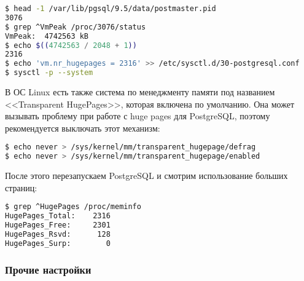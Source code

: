 \begin{lstlisting}[language=Bash,label=lst:settings_hugepages2,caption=Включаем поддержку huge pages в системе]
$ head -1 /var/lib/pgsql/9.5/data/postmaster.pid
3076
$ grep ^VmPeak /proc/3076/status
VmPeak:  4742563 kB
$ echo $((4742563 / 2048 + 1))
2316
$ echo 'vm.nr_hugepages = 2316' >> /etc/sysctl.d/30-postgresql.conf
$ sysctl -p --system
\end{lstlisting}

В ОС Linux есть также система по менеджменту памяти под названием <<Transparent HugePages>>, которая включена по умолчанию. Она может вызывать проблему при работе с huge pages для PostgreSQL, поэтому рекомендуется выключать этот механизм:

\begin{lstlisting}[language=Bash,label=lst:settings_hugepages3,caption=Отключаем Transparent HugePages]
$ echo never > /sys/kernel/mm/transparent_hugepage/defrag
$ echo never > /sys/kernel/mm/transparent_hugepage/enabled
\end{lstlisting}

После этого перезапускаем PostgreSQL и смотрим использование больших страниц:

\begin{lstlisting}[language=Bash,label=lst:settings_hugepages4,caption=Проверяем использование huge pages]
$ grep ^HugePages /proc/meminfo
HugePages_Total:    2316
HugePages_Free:     2301
HugePages_Rsvd:      128
HugePages_Surp:        0
\end{lstlisting}


\subsubsection{Прочие настройки}

